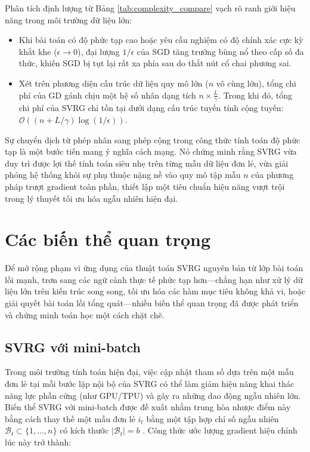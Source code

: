 Phân tích định lượng từ Bảng \ref{tab:complexity_compare} vạch rõ ranh giới hiệu năng trong môi trường dữ liệu lớn:

\begin{itemize}

    \item Khi bài toán có độ phức tạp cao hoặc yêu cầu nghiệm có độ chính xác cực kỳ khắt khe ($\epsilon \to 0$), đại lượng $1/\epsilon$ của SGD tăng trưởng bùng nổ theo cấp số đa thức, khiến SGD bị tụt lại rất xa phía sau do thắt nút cổ chai phương sai.

    \item Xét trên phương diện cấu trúc dữ liệu quy mô lớn ($n$ vô cùng lớn), tổng chi phí của GD gánh chịu một hệ số nhân dạng tích $n \times \frac{L}{\gamma}$. Trong khi đó, tổng chi phí của SVRG chỉ tồn tại dưới dạng cấu trúc tuyến tính cộng tuyến: $\mathcal{O}((n + L/\gamma)\log(1/\epsilon))$. 

\end{itemize}

Sự chuyển dịch từ phép nhân sang phép cộng trong công thức tính toán độ phức tạp là một bước tiến mang ý nghĩa cách mạng. Nó chứng minh rằng SVRG vừa duy trì được lợi thế tính toán siêu nhẹ trên từng mẫu dữ liệu đơn lẻ, vừa giải phóng hệ thống khỏi sự phụ thuộc nặng nề vào quy mô tập mẫu $n$ của phương pháp trượt gradient toàn phần, thiết lập một tiêu chuẩn hiệu năng vượt trội trong lý thuyết tối ưu hóa ngẫu nhiên hiện đại.

\section{Các biến thể quan trọng}

Để mở rộng phạm vi ứng dụng của thuật toán SVRG nguyên bản từ lớp bài toán lồi mạnh, trơn sang các ngữ cảnh thực tế phức tạp hơn—chẳng hạn như xử lý dữ liệu lớn trên kiến trúc song song, tối ưu hóa các hàm mục tiêu không khả vi, hoặc giải quyết bài toán lồi tổng quát—nhiều biến thể quan trọng đã được phát triển và chứng minh toán học một cách chặt chẽ.

\subsection{SVRG với mini-batch}

Trong môi trường tính toán hiện đại, việc cập nhật tham số dựa trên một mẫu đơn lẻ tại mỗi bước lặp nội bộ của SVRG có thể làm giảm hiệu năng khai thác năng lực phần cứng (như GPU/TPU) và gây ra những dao động ngẫu nhiên lớn. Biến thể SVRG với mini-batch được đề xuất nhằm trung hòa nhược điểm này bằng cách thay thế một mẫu đơn lẻ $i_t$ bằng một tập hợp chỉ số ngẫu nhiên $\mathcal{B}_t \subset \{1, \dots, n\}$ có kích thước $|\mathcal{B}_t| = b$ \cite{schmidt2017minimizing}. Công thức ước lượng gradient hiệu chỉnh lúc này trở thành:

